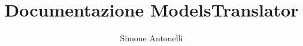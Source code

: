 
\usepackage{MCLabPaper}

\graphicspath{{models_translator/imgs/}}
\renewcommand\labelitemi{$\vcenter{\hbox{\tiny$\bullet$}}$}

\setcounter{secnumdepth}{3}
\setcounter{tocdepth}{5}


\title{Documentazione ModelsTranslator}
\author{Simone Antonelli}
\date{}
